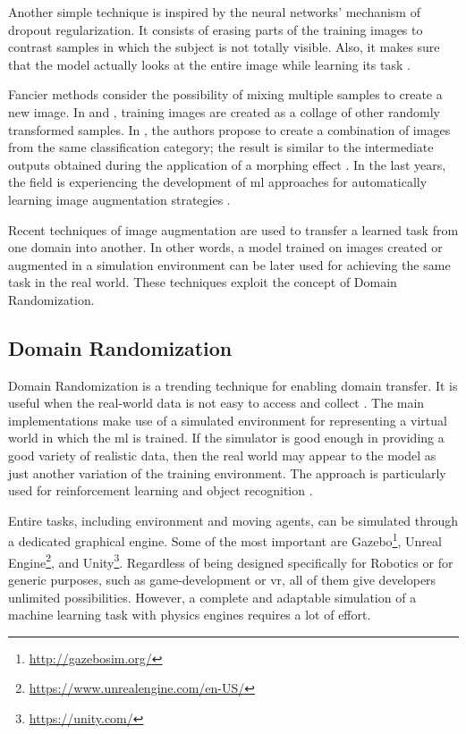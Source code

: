 Another simple technique is inspired by the neural networks' mechanism of dropout regularization. It consists of erasing parts of the training images to contrast samples in which the subject is not totally visible. Also, it makes sure that the model actually looks at the entire image while learning its task \cite{wan2013dropconn} \cite{zhong2017random}. 

Fancier methods consider the possibility of mixing multiple samples to create a new image. In \cite{Takahashi_2020} and \cite{summers2019improved}, training images are created as a collage of other randomly transformed samples. In \cite{Lemley_2017}, the authors propose to create a combination of images from the same classification category; the result is similar to the intermediate outputs obtained during the application of a morphing effect \cite{wiki_morphing}. In the last years, the field is experiencing the development of \gls{ml} approaches for automatically learning image augmentation strategies \cite{zoph2019learning} \cite{cubuk2019autoaugment}.

Recent techniques of image augmentation are used to transfer a learned task from one domain into another. In other words, a model trained on images created or augmented in a simulation environment can be later used for achieving the same task in the real world. These techniques exploit the concept of Domain Randomization.



\subsection{Domain Randomization}
\label{subsec:domain-randomization}

Domain Randomization is a trending technique for enabling domain transfer. It is useful when the real-world data is not easy to access and collect \cite{mehta2019active}. The main implementations make use of a simulated environment for representing a virtual world in which the \gls{ml} is trained. If the simulator is good enough in providing a good variety of realistic data, then the real world may appear to the model as just another variation of the training environment. The approach is particularly used for reinforcement learning \cite{imitation_learning_3d_navigation} and object recognition \cite{weng2019DR} \cite{tobin2017domain}.

Entire tasks, including environment and moving agents, can be simulated through a dedicated graphical engine. Some of the most important are Gazebo\footnote{\url{http://gazebosim.org/}}, Unreal Engine\footnote{\url{https://www.unrealengine.com/en-US/}}, and Unity\footnote{\url{https://unity.com/}}. Regardless of being designed specifically for Robotics or for generic purposes, such as game-development or \gls{vr}, all of them give developers unlimited possibilities. However, a complete and adaptable simulation of a machine learning task with physics engines requires a lot of effort.

